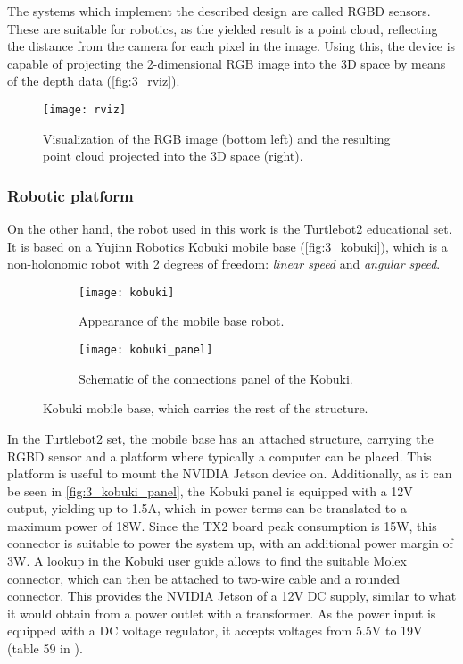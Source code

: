 The systems which implement the described design are called RGBD sensors. These are suitable for robotics, as the yielded result is a point cloud, reflecting the distance from the camera for each pixel in the image. Using this, the device is capable of projecting the 2-dimensional RGB image into the 3D space by means of the depth data (\autoref{fig:3_rviz}).\\

\begin{figure}[h]
	\centering
	\texttt{[image: rviz]}
	\caption{Visualization of the RGB image (bottom left) and the resulting point cloud projected into the 3D space (right).}
	\label{fig:3_rviz}
\end{figure}

\subsubsection{Robotic platform}
On the other hand, the robot used in this work is the Turtlebot2 educational set. It is based on a Yujinn Robotics Kobuki mobile base (\autoref{fig:3_kobuki}), which is a non-holonomic robot with 2 degrees of freedom: \textit{linear speed} and \textit{angular speed}.\\
\begin{figure}[h]
	\centering
	\begin{subfigure}[h]{0.4\linewidth}
		\centering
		\texttt{[image: kobuki]}
		\caption{Appearance of the mobile base robot.}
		\label{fig:3_kobuki_appearance}
	\end{subfigure}
\begin{subfigure}[h]{0.5\linewidth}
	\centering
	\texttt{[image: kobuki\_panel]}
	\caption{Schematic of the connections panel of the Kobuki.}
	\label{fig:3_kobuki_panel}
\end{subfigure}
\caption{Kobuki mobile base, which carries the rest of the structure.}
\label{fig:3_kobuki}
\end{figure}

In the Turtlebot2 set, the mobile base has an attached structure, carrying the RGBD sensor and a platform where typically a computer can be placed. This platform is useful to mount the NVIDIA Jetson device on. Additionally, as it can be seen in \autoref{fig:3_kobuki_panel}, the Kobuki panel is equipped with a 12V output, yielding up to 1.5A, which in power terms can be translated to a maximum power of 18W. Since the TX2 board peak consumption is 15W, this connector is suitable to power the system up, with an additional power margin of 3W. A lookup in the Kobuki user guide \cite{kobuki_manual} allows to find the suitable Molex connector, which can then be attached to two-wire cable and a rounded connector. This provides the NVIDIA Jetson of a 12V DC supply, similar to what it would obtain from a power outlet with a transformer. As the power input is equipped with a DC voltage regulator, it accepts voltages from 5.5V to 19V (table 59 in \cite{tx2_manual}).\\

